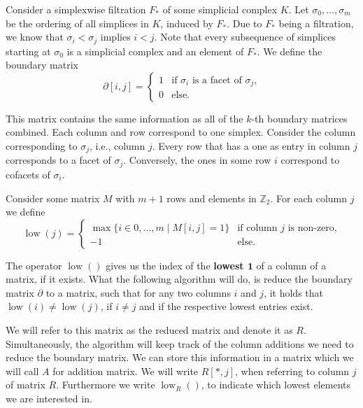 Consider a simplexwise filtration $F_*$ of some simplicial complex $K$. Let $\sigma_0,\dots,\sigma_m$ be the ordering of all simplices in $K$, induced by $F_*$. Due to $F_*$ being a filtration, we know that $\sigma_i < \sigma_j$ implies $i<j$. Note that every subsequence of simplices starting at $\sigma_0$ is a simplicial complex and an element of $F_*$. We define the boundary matrix \[
\partial[i,j] = \begin{cases} 
      1 & \text{if $\sigma_i$ is a facet of $\sigma_j$,} \\
      0 & \text{else.} 
   \end{cases}
\]

This matrix contains the same information as all of the $k$-th boundary matrices combined. Each column and row correspond to one simplex. Consider the column corresponding to $\sigma_j$, i.e., column $j$. Every row that has a one as entry in column $j$ corresponds to a facet of $\sigma_j$.
Conversely, the ones in some row $i$ correspond to cofacets of $\sigma_i$.

\begin{defi}
Consider some matrix $M$ with $m+1$ rows and elements in $\mathbb{Z}_2$.
For each column $j$ we define \[
\operatorname{low}(j) = \begin{cases} 

      \operatorname{max}\{i \in 0,\dots,m \mid M[i,j] = 1\} & \text{if column $j$ is non-zero,} \\
      -1 & \text{else.} 
      
   \end{cases}
\]
\end{defi}

The operator $\operatorname{low}()$ gives us the index of the \textbf{lowest $\bm{1}$} of a column of a matrix, if it exists. What the following algorithm will do, is reduce the boundary matrix $\partial$ to a matrix, such that for any two columns $i$ and $j$, it holds that $\operatorname{low}(i) \neq \operatorname{low}(j)$, if $i \neq j$ and if the respective lowest entries exist. 

We will refer to this matrix as the reduced matrix and denote it as $R$. Simultaneously, the algorithm will keep track of the column additions we need to reduce the boundary matrix. We can store this information in a matrix which we will call $A$ for addition matrix. We will write $R[*,j]$, when referring to column $j$ of matrix $R$. Furthermore we write $\operatorname{low}_R()$, to indicate which lowest elements we are interested in. 

